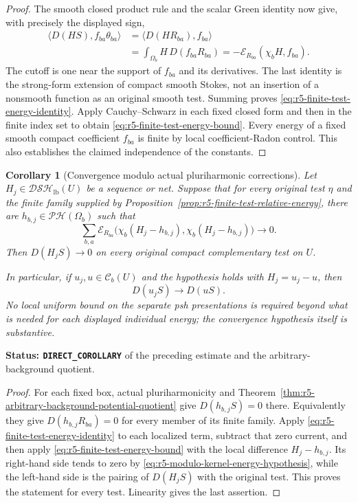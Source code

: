 \documentclass[11pt,a4paper]{article}
\numberwithin{equation}{section}
\newtheorem{corollary}[theorem]{Corollary}
\theoremstyle{definition}
\theoremstyle{remark}
\begin{document}
\begin{proof}
The smooth closed product rule and the scalar Green identity
now give, with precisely the displayed sign,
\[
 \begin{split}
 \langle D(HS),f_{ba}\theta_{ba}\rangle
   &=\langle D(HR_{ba}),f_{ba}\rangle\\
   &=\int_{\Omega_b}H\,D(f_{ba}R_{ba})
     =-\mathcal E_{R_{ba}}(\chi_bH,f_{ba}).
 \end{split}
\]
The cutoff is one near the support of $f_{ba}$ and its
derivatives. The last identity is the strong-form extension
of compact smooth Stokes, not an insertion of a nonsmooth
function as an original smooth test. Summing proves
\eqref{eq:r5-finite-test-energy-identity}. Apply
Cauchy--Schwarz in each fixed closed form and then in the
finite index set to obtain
\eqref{eq:r5-finite-test-energy-bound}. Every energy of a
fixed smooth compact coefficient $f_{ba}$ is finite by local
coefficient-Radon control. This also establishes the claimed
independence of the constants.
\end{proof}

\begin{corollary}[Convergence modulo actual pluriharmonic corrections]
\label{cor:r5-energy-modulo-kernel-convergence}
Let $H_j\in\mathscr{DSH}_{\mathrm{lb}}(U)$ be a sequence
or net. Suppose that for every original test $\eta$ and the
finite family supplied by
Proposition~\ref{prop:r5-finite-test-relative-energy}, there
are $h_{b,j}\in\mathscr{PH}(\Omega_b)$ such that
\begin{equation}
 \sum_{b,a}\mathcal E_{R_{ba}}
       \bigl(\chi_b(H_j-h_{b,j}),
             \chi_b(H_j-h_{b,j})\bigr)\longrightarrow0.
 \label{eq:r5-modulo-kernel-energy-hypothesis}
\end{equation}
Then $D(H_jS)\longrightarrow0$ on every original compact
complementary test on $U$.

In particular, if $u_j,u\in\mathcal C_b(U)$ and the
hypothesis holds with $H_j=u_j-u$, then
\[
                           D(u_jS)\longrightarrow D(uS).
\]
No local uniform bound on the separate psh presentations is
required beyond what is needed for each displayed individual
energy; the convergence hypothesis itself is substantive.
\end{corollary}

\noindent\textbf{Status: \texttt{DIRECT\_COROLLARY}} of
the preceding estimate and the arbitrary-background quotient.

\begin{proof}
For each fixed box, actual pluriharmonicity and
Theorem~\ref{thm:r5-arbitrary-background-potential-quotient}
give $D(h_{b,j}S)=0$ there. Equivalently they give
$D(h_{b,j}R_{ba})=0$ for every member of its finite family.
Apply \eqref{eq:r5-finite-test-energy-identity} to each
localized term, subtract that zero current, and then apply
\eqref{eq:r5-finite-test-energy-bound} with the local
difference $H_j-h_{b,j}$. Its right-hand side tends to zero
by \eqref{eq:r5-modulo-kernel-energy-hypothesis}, while the
left-hand side is the pairing of $D(H_jS)$ with the original
test. This proves the statement for every test. Linearity
gives the last assertion.
\end{proof}
\end{document}
